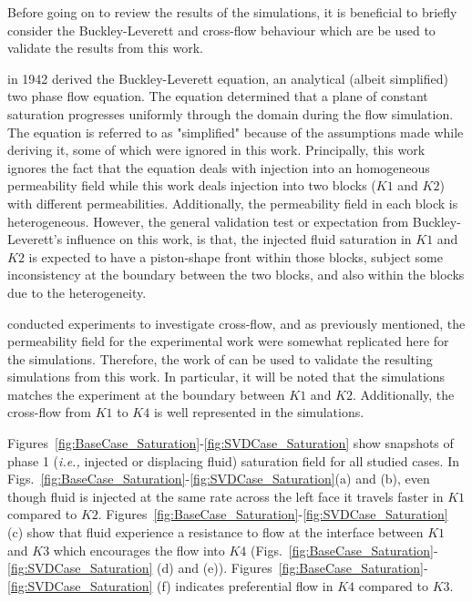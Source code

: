 \documentclass[preprint,12pt]{elsarticle}
\newcommand{\ie}{{\it i.e., }}
\begin{document}
Before going on to review the results of the simulations, it is beneficial to briefly consider the Buckley-Leverett and cross-flow behaviour which are be used to validate the results from this work. 

\citet{buckley_1942} in 1942 derived the Buckley-Leverett equation, an analytical (albeit simplified) two phase flow equation. The equation determined that a plane of constant saturation progresses uniformly through the domain during the flow simulation. The equation is referred to as "simplified" because of the assumptions made while deriving it, some of which were ignored in this work. Principally, this work ignores the fact that the equation deals with injection into an homogeneous permeability field while this work deals injection into two blocks ($K1$ and $K2$) with different permeabilities. Additionally, the permeability field in each block is heterogeneous. However, the general validation test or expectation from Buckley-Leverett's influence on this work, is that, the injected fluid saturation in $K1$ and $K2$ is expected to have a piston-shape front within those blocks, subject some inconsistency at the boundary between the two blocks, and also within the blocks due to the heterogeneity.

\citet{dawe_2008} conducted experiments to investigate cross-flow, and as previously mentioned, the permeability field for the experimental work were somewhat replicated here for the simulations. Therefore, the work of \citet{dawe_2008} can be used to validate the resulting simulations from this work. In particular, it will be noted that the simulations matches the experiment at the boundary between $K1$ and $K2$. Additionally, the cross-flow from $K1$ to $K4$ is well represented in the simulations.

Figures~\ref{fig:BaseCase_Saturation}-\ref{fig:SVDCase_Saturation} show snapshots of phase 1 (\ie injected or displacing fluid) saturation field for all studied cases. In Figs.~\ref{fig:BaseCase_Saturation}-\ref{fig:SVDCase_Saturation}(a) and (b), even though fluid is injected at the same rate across the left face it travels faster in $K1$ compared to $K2$. Figures~\ref{fig:BaseCase_Saturation}-\ref{fig:SVDCase_Saturation} (c) show that fluid experience a resistance to flow at the interface between $K1$ and $K3$ which encourages the flow into $K4$ (Figs.~\ref{fig:BaseCase_Saturation}-\ref{fig:SVDCase_Saturation} (d) and (e)). Figures~\ref{fig:BaseCase_Saturation}-\ref{fig:SVDCase_Saturation} (f) indicates preferential flow in $K4$ compared to $K3$.
\end{document}
